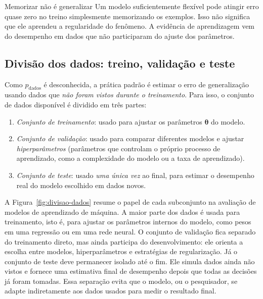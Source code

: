 \documentclass[12pt,a4paper]{article}
\begin{document}
\begin{alertabox}{Memorizar não é generalizar}
Um modelo suficientemente flexível pode atingir erro quase zero no treino simplesmente memorizando os exemplos. Isso não significa que ele aprendeu a regularidade do fenômeno. A evidência de aprendizagem vem do desempenho em dados que não participaram do ajuste dos parâmetros.
\end{alertabox}

\subsection{Divisão dos dados: treino, validação e teste}
\label{subsec:divisao}

Como $p_{\text{dados}}$ é desconhecida, a prática padrão é estimar o erro de generalização usando dados que \emph{não foram vistos durante o treinamento}. Para isso, o conjunto de dados disponível é dividido em três partes:

\begin{enumerate}
    \item \emph{Conjunto de treinamento}: usado para ajustar os parâmetros $\boldsymbol{\theta}$ do modelo.
    \item \emph{Conjunto de validação}: usado para comparar diferentes modelos e ajustar \emph{hiperparâmetros} (parâmetros que controlam o próprio processo de aprendizado, como a complexidade do modelo ou a taxa de aprendizado).
    \item \emph{Conjunto de teste}: usado \emph{uma única vez} ao final, para estimar o desempenho real do modelo escolhido em dados novos.
\end{enumerate}

A Figura~\ref{fig:divisao-dados} resume o papel de cada subconjunto na avaliação de modelos de aprendizado de máquina. A maior parte dos dados é usada para treinamento, isto é, para ajustar os parâmetros internos do modelo, como pesos em uma regressão ou em uma rede neural. O conjunto de validação fica separado do treinamento direto, mas ainda participa do desenvolvimento: ele orienta a escolha entre modelos, hiperparâmetros e estratégias de regularização. Já o conjunto de teste deve permanecer isolado até o fim. Ele simula dados ainda não vistos e fornece uma estimativa final de desempenho depois que todas as decisões já foram tomadas. Essa separação evita que o modelo, ou o pesquisador, se adapte indiretamente aos dados usados para medir o resultado final.
\end{document}
